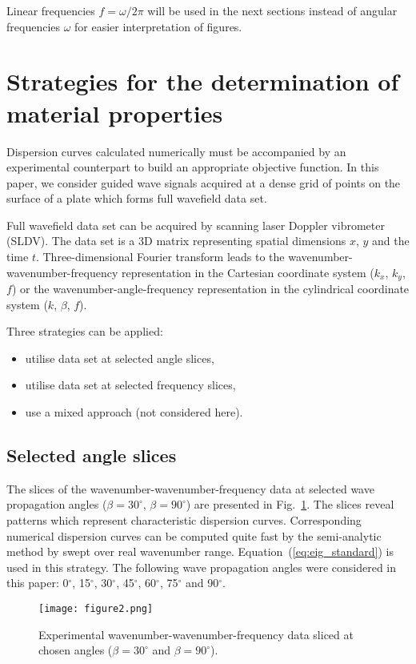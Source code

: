 \documentclass[preprint,12pt]{elsarticle}
\begin{document}
Linear frequencies $f=\omega/2 \pi$ will be used in the next sections instead of angular frequencies $\omega$ for easier interpretation of figures.
\section{Strategies for the determination of material properties \label{sec:strategies}}
Dispersion curves calculated numerically must be accompanied by an experimental counterpart to build an appropriate objective function. 
In this paper, we consider guided wave signals acquired at a dense grid of points on the surface of a plate which forms full wavefield data set. 

Full wavefield data set can be acquired by scanning laser Doppler vibrometer (SLDV).
The data set is a 3D matrix representing spatial dimensions $x$, $y$ and the time $t$. 
Three-dimensional Fourier transform leads to the wavenumber-wavenumber-frequency representation  in the Cartesian coordinate system ($k_x$, $k_y$, $f$) or the wavenumber-angle-frequency representation in the cylindrical coordinate system ($k$, $\beta$, $f$).

Three strategies can be applied:
\begin{itemize}
	\item utilise data set at selected angle slices,
	\item utilise data set at selected frequency slices,
	\item use a mixed approach (not considered here).
\end{itemize}
\subsection{Selected angle slices}
The slices of the wavenumber-wavenumber-frequency data at selected wave propagation angles ($\beta=30^{\circ}$, $\beta=90^{\circ}$) are presented in Fig.~\ref{fig:angle_slice}. 
The slices reveal patterns which represent characteristic dispersion curves. 
Corresponding numerical dispersion curves can be computed quite fast by the semi-analytic method by swept over real wavenumber range.
Equation~(\ref{eq:eig_standard}) is used in this strategy.
The following wave propagation angles were considered in this paper: 0$^{\circ}$, 15$^{\circ}$, 30$^{\circ}$, 45$^{\circ}$, 60$^{\circ}$, 75$^{\circ}$ and 90$^{\circ}$.
\begin{figure} [h!]
	\centering
	\texttt{[image: figure2.png]}	
	\caption{Experimental wavenumber-wavenumber-frequency data sliced at chosen angles ($\beta=30^{\circ}$ and $\beta=90^{\circ}$).}
	\label{fig:angle_slice}
\end{figure}
\end{document}
